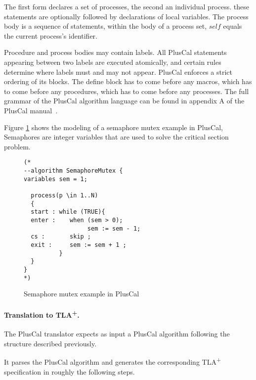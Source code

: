 \documentclass{thesul}
\newcommand{\tlaplus}{TLA\textsuperscript{+}\xspace}
\begin{document}
The first form declares a set of processes, the second an individual process. these statements are optionally followed by declarations of local variables. The process body is a sequence of statements, within the body of a process set, $self$ equals the current process's identifier.

Procedure and process bodies may contain labels. All PlusCal statements appearing between two labels are executed atomically, and certain rules determine where labels must and may not appear.
PlusCal enforces a strict ordering of its blocks. The define block has to come before any macros, which has to come before any procedures, which has to come before any processes. The full grammar of the PlusCal algorithm language can be found in appendix A of the PlusCal manual~\cite{pcalAlgo}.

Figure \ref{semaphoreEx} shows the modeling of a semaphore mutex example in PlusCal, Semaphores are integer variables that are used to solve the critical section problem.

\FloatBarrier 
\begin{figure}
\begin{lstlisting}[frame = tlrb, firstnumber = 1]
(*
--algorithm SemaphoreMutex {
variables sem = 1;

  process(p \in 1..N)
  {
  start : while (TRUE){
  enter :    when (sem > 0);
                  sem := sem - 1;            
  cs :       skip ;
  exit :     sem := sem + 1 ;
          }
  }
}
*)

\end{lstlisting}
\caption{Semaphore mutex example in PlusCal}
\label{semaphoreEx}
\end{figure} 

\paragraph{Translation to \tlaplus.}
The PlusCal translator expects as input a PlusCal algorithm following the structure described previously.

It parses the PlusCal algorithm and generates the corresponding \tlaplus specification in roughly the following steps.
\end{document}

